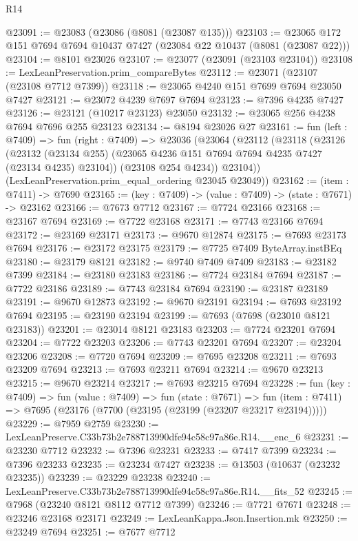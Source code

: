 \begin{lexlean}{R14}
\begin{coremodule}
@23091 := @23083 (@23086 (@8081 (@23087 @135)))
@23103 := @23065 @172 @151 @7694 @7694 @10437 @7427 (@23084 @22 @10437 (@8081 (@23087 @22)))
@23104 := @8101 @23026
@23107 := @23077 (@23091 (@23103 @23104))
@23108 := LexLeanPreservation.prim_compareBytes
@23112 := @23071 (@23107 (@23108 @7712 @7399))
@23118 := @23065 @4240 @151 @7699 @7694 @23050 @7427
@23121 := @23072 @4239 @7697 @7694
@23123 := @7396 @4235 @7427
@23126 := @23121 (@10217 @23123) @23050
@23132 := @23065 @256 @4238 @7694 @7696 @255 @23123
@23134 := @8194 @23026 @27
@23161 := fun (left : @7409) =>
  fun (right : @7409) =>
  @23036
    (@23064
      (@23112
        (@23118
          (@23126
            (@23132 (@23134 @255) (@23065 @4236 @151 @7694 @7694 @4235 @7427 (@23134 @4235) @23104))
            (@23108 @254 @4234))
          @23104))
      (LexLeanPreservation.prim_equal_ordering @23045 @23049))
@23162 := (item : @7411) -> @7690
@23165 := (key : @7409) -> (value : @7409) -> (state : @7671) -> @23162
@23166 := @7673 @7712
@23167 := @7724 @23166
@23168 := @23167 @7694
@23169 := @7722 @23168
@23171 := @7743 @23166 @7694
@23172 := @23169 @23171
@23173 := @9670 @12874
@23175 := @7693 @23173 @7694
@23176 := @23172 @23175
@23179 := @7725 @7409 ByteArray.instBEq
@23180 := @23179 @8121
@23182 := @9740 @7409 @7409
@23183 := @23182 @7399
@23184 := @23180 @23183
@23186 := @7724 @23184 @7694
@23187 := @7722 @23186
@23189 := @7743 @23184 @7694
@23190 := @23187 @23189
@23191 := @9670 @12873
@23192 := @9670 @23191
@23194 := @7693 @23192 @7694
@23195 := @23190 @23194
@23199 := @7693 (@7698 (@23010 @8121 @23183))
@23201 := @23014 @8121 @23183
@23203 := @7724 @23201 @7694
@23204 := @7722 @23203
@23206 := @7743 @23201 @7694
@23207 := @23204 @23206
@23208 := @7720 @7694
@23209 := @7695 @23208
@23211 := @7693 @23209 @7694
@23213 := @7693 @23211 @7694
@23214 := @9670 @23213
@23215 := @9670 @23214
@23217 := @7693 @23215 @7694
@23228 := fun (key : @7409) =>
  fun (value : @7409) =>
  fun (state : @7671) =>
  fun (item : @7411) => @7695 (@23176 (@7700 (@23195 (@23199 (@23207 @23217 @23194)))))
@23229 := @7959 @2759
@23230 := LexLeanPreserve.C33b73b2e788713990dfe94c58c97a86e.R14.__enc_6
@23231 := @23230 @7712
@23232 := @7396 @23231
@23233 := @7417 @7399
@23234 := @7396 @23233
@23235 := @23234 @7427
@23238 := @13503 (@10637 (@23232 @23235))
@23239 := @23229 @23238
@23240 := LexLeanPreserve.C33b73b2e788713990dfe94c58c97a86e.R14.__fits_52
@23245 := @7968 (@23240 @8121 @8112 @7712 @7399)
@23246 := @7721 @7671
@23248 := @23246 @23168 @23171
@23249 := LexLeanKappa.Json.Insertion.mk
@23250 := @23249 @7694
@23251 := @7677 @7712

\end{coremodule}
\end{lexlean}
